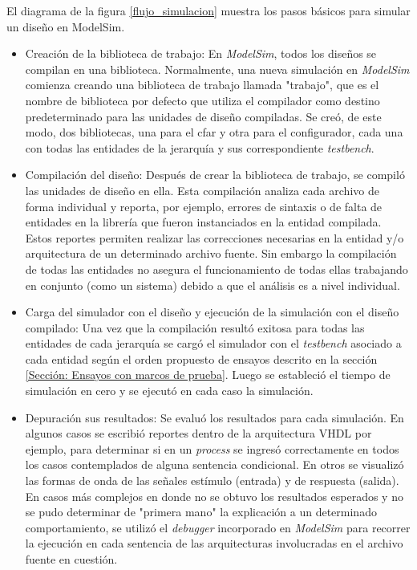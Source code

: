 El diagrama de la figura \ref{flujo_simulacion} muestra los pasos básicos para simular un diseño en ModelSim.

\begin{itemize}
\item
Creación de la biblioteca de trabajo:
En \textit{ModelSim}, todos los diseños se compilan en una biblioteca. Normalmente, una nueva simulación en \textit{ModelSim} comienza creando una biblioteca de trabajo llamada "trabajo", que es el nombre de biblioteca por defecto que utiliza el compilador como destino predeterminado para las unidades de diseño compiladas. Se creó, de este modo, dos bibliotecas, una para el cfar y otra para el configurador, cada una con todas las entidades de la jerarquía y sus correspondiente \textit{testbench}.

\item
Compilación del diseño:
Después de crear la biblioteca de trabajo, se compiló las unidades de diseño en ella. Esta compilación analiza cada archivo de forma individual y reporta, por ejemplo, errores de sintaxis o de falta de entidades en la librería que fueron instanciados en la entidad compilada. Estos reportes permiten realizar las correcciones necesarias en la entidad y/o arquitectura de un determinado archivo fuente. Sin embargo la compilación de todas las entidades no asegura el funcionamiento de todas ellas trabajando en conjunto (como un sistema) debido a que el análisis es a nivel individual.

\item
Carga del simulador con el diseño y ejecución de la simulación con el diseño compilado:
Una vez que la compilación resultó exitosa para todas las entidades de cada jerarquía se cargó el simulador con el \textit{testbench} asociado a cada entidad según el orden propuesto de ensayos descrito en la sección \ref{Sección: Ensayos con marcos de prueba}. Luego se estableció el tiempo de simulación en cero y se ejecutó en cada caso la simulación.

\item
Depuración sus resultados:
Se evaluó los resultados para cada simulación. En algunos casos se escribió reportes dentro de la arquitectura VHDL por ejemplo, para determinar si en un \textit{process} se ingresó correctamente en todos los casos contemplados de alguna sentencia condicional. En otros se visualizó las formas de onda de las señales estímulo (entrada) y de respuesta (salida). En casos más complejos en donde no se obtuvo los resultados esperados y no se pudo determinar de "primera mano" la explicación a un determinado comportamiento, se utilizó el \textit{debugger} incorporado en \textit{ModelSim} para recorrer la ejecución en cada sentencia de las arquitecturas involucradas en el archivo fuente en cuestión.
\end{itemize}



